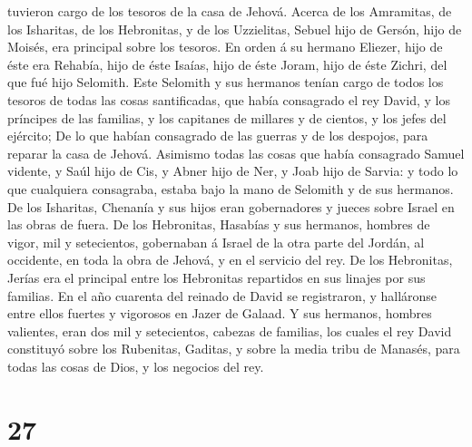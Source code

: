 tuvieron cargo de los tesoros de la casa de Jehová.  Acerca
de los Amramitas, de los Isharitas, de los Hebronitas, y de los
Uzzielitas,  Sebuel hijo de Gersón, hijo de Moisés, era
principal sobre los tesoros.  En orden á su hermano
Eliezer, hijo de éste era Rehabía, hijo de éste Isaías, hijo de éste
Joram, hijo de éste Zichri, del que fué hijo Selomith. 
Este Selomith y sus hermanos tenían cargo de todos los tesoros de todas
las cosas santificadas, que había consagrado el rey David, y los
príncipes de las familias, y los capitanes de millares y de cientos, y
los jefes del ejército;  De lo que habían consagrado de las
guerras y de los despojos, para reparar la casa de Jehová. 
Asimismo todas las cosas que había consagrado Samuel vidente, y Saúl
hijo de Cis, y Abner hijo de Ner, y Joab hijo de Sarvia: y todo lo que
cualquiera consagraba, estaba bajo la mano de Selomith y de sus
hermanos.  De los Isharitas, Chenanía y sus hijos eran
gobernadores y jueces sobre Israel en las obras de fuera. 
De los Hebronitas, Hasabías y sus hermanos, hombres de vigor, mil y
setecientos, gobernaban á Israel de la otra parte del Jordán, al
occidente, en toda la obra de Jehová, y en el servicio del rey.
 De los Hebronitas, Jerías era el principal entre los
Hebronitas repartidos en sus linajes por sus familias. En el año
cuarenta del reinado de David se registraron, y halláronse entre ellos
fuertes y vigorosos en Jazer de Galaad.  Y sus hermanos,
hombres valientes, eran dos mil y setecientos, cabezas de familias, los
cuales el rey David constituyó sobre los Rubenitas, Gaditas, y sobre la
media tribu de Manasés, para todas las cosas de Dios, y los negocios del
rey.

\hypertarget{section-26}{%
\section{27}\label{section-26}}

